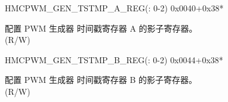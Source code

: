 \begin{register}{H}{MCPWM\_GEN\_TSTMP\_A\_REG(: 0-2)}
{0x0040+0x38*}\label{regdesc:MCPWMGENNTSTMPAREG}
%
%
\regnewline%
\begin{regdesc}\begin{reglist}
\label{fielddesc:MCPWMCMPRNA}\item [MCPWM\_CMPR\regindex{n}\_A] 配置 PWM 生成器 时间戳寄存器 A 的影子寄存器。\\(R/W)
\end{reglist}\end{regdesc}
\end{register}


\begin{register}{H}{MCPWM\_GEN\_TSTMP\_B\_REG(: 0-2)}
{0x0044+0x38*}\label{regdesc:MCPWMGENNTSTMPBREG}
%
%
\regnewline%
\begin{regdesc}\begin{reglist}
\label{fielddesc:MCPWMCMPRNB}\item [MCPWM\_CMPR\regindex{n}\_B] 配置 PWM 生成器 时间戳寄存器 B 的影子寄存器。 \\(R/W)
\end{reglist}\end{regdesc}
\end{register}



